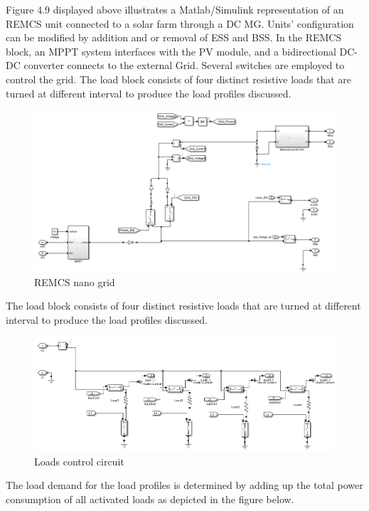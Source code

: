 Figure 4.9 displayed above illustrates a Matlab/Simulink representation of an REMCS unit connected to a solar farm through a DC MG. Units’ configuration can be modified by addition and or removal of ESS and BSS. In the REMCS block, an MPPT system interfaces with the PV module, and a bidirectional DC-DC converter connects to the external Grid. Several switches are employed to control the grid. The load block consists of four distinct resistive loads that are turned at different interval to produce the load profiles discussed.\par

\begin{figure}[H]
	\centering
	\includegraphics[totalheight=6cm]{Figures/remcs nano grid.png}
	\caption{REMCS nano grid}
\end{figure}
The load block consists of four distinct resistive loads that are turned at different interval to produce the load profiles discussed.\par
\begin{figure}[H]
	\centering
	\includegraphics[totalheight=6cm]{Figures/loads control circuit.png}
	\caption{Loads control circuit}
\end{figure}
The load demand for the load profiles is determined by adding up the total power consumption of all activated loads as depicted in the figure below.\par

